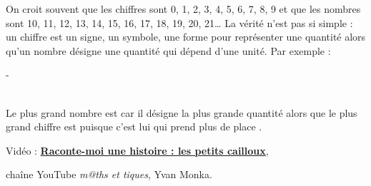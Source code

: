 \vspace*{-2mm}

\begin{debat}
    On croit souvent que les chiffres sont 0, 1, 2, 3, 4, 5, 6, 7, 8, 9 et que les nombres sont 10, 11, 12, 13, 14, 15, 16, 17, 18, 19, 20, 21\dots{} La vérité n'est pas si simple : un chiffre est un signe, un symbole, une forme pour représenter une quantité alors qu'un nombre désigne une quantité qui dépend d'une unité. Par exemple : \\ [5mm]
    \centerline{\textcolor{B1}{\fontsize{30}{30} \; - \; \fontsize{60}{60}}} \\ [5mm]
    Le plus grand nombre est  \fg{} car il désigne la plus grande quantité alors que le plus grand chiffre est  \fg{} puisque c'est lui qui prend \og plus de place \fg.
    \bigskip
    \begin{cadre}[B2][F4]
       \begin{center}
          Vidéo : \href{https://www.yout-ube.com/watch?v=WRrLnktqUmE&feature=emb_logo}{\bf Raconte-moi une histoire : les petits cailloux},
          
          chaîne YouTube {\it m@ths et tiques}, Yvan Monka.
       \end{center}
    \end{cadre}
 \end{debat}